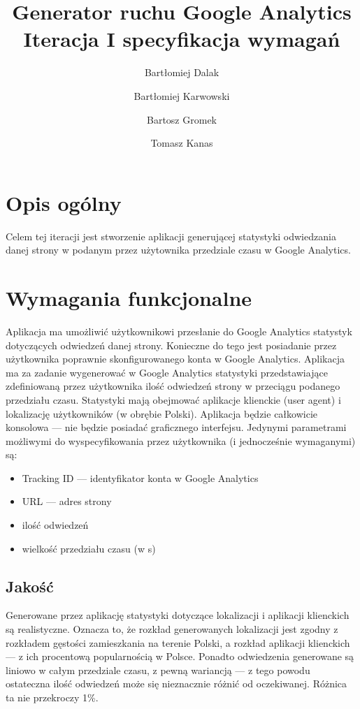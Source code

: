 \documentclass{article}
\title{Generator ruchu Google Analytics \\ Iteracja I specyfikacja wymagań}
\author{Bartłomiej Dalak \and Bartłomiej Karwowski \and Bartosz Gromek \and Tomasz Kanas}
\begin{document}
\maketitle

\section{Opis ogólny}

Celem tej iteracji jest stworzenie aplikacji generującej statystyki odwiedzania danej strony w podanym przez użytownika przedziale czasu w Google Analytics.

\section{Wymagania funkcjonalne}

Aplikacja ma umożliwić użytkownikowi przesłanie do Google Analytics statystyk dotyczących odwiedzeń danej strony. Konieczne do tego jest posiadanie przez użytkownika poprawnie skonfigurowanego konta w Google Analytics. Aplikacja ma za zadanie wygenerować w Google Analytics statystyki przedstawiające zdefiniowaną przez użytkownika ilość odwiedzeń strony w przeciągu podanego przedziału czasu. Statystyki mają obejmować aplikacje klienckie (user agent) i lokalizację użytkowników (w obrębie Polski). Aplikacja będzie całkowicie konsolowa --- nie będzie posiadać graficznego interfejsu. Jedynymi parametrami możliwymi do wyspecyfikowania przez użytkownika (i jednocześnie wymaganymi) są:
\begin{itemize}
\item Tracking ID --- identyfikator konta w Google Analytics
\item URL --- adres strony
\item ilość odwiedzeń
\item wielkość przedziału czasu (w s)
\end{itemize}

\subsection{Jakość}
Generowane przez aplikację statystyki dotyczące lokalizacji i aplikacji klienckich są realistyczne. Oznacza to, że rozkład generowanych lokalizacji jest zgodny z rozkładem gęstości zamieszkania na terenie Polski, a rozkład aplikacji klienckich --- z ich procentową popularnością w Polsce. Ponadto odwiedzenia generowane są liniowo w całym przedziale czasu, z pewną wariancją --- z tego powodu ostateczna ilość odwiedzeń może się nieznacznie różnić od oczekiwanej. Różnica ta nie przekroczy 1\%.
\end{document}
